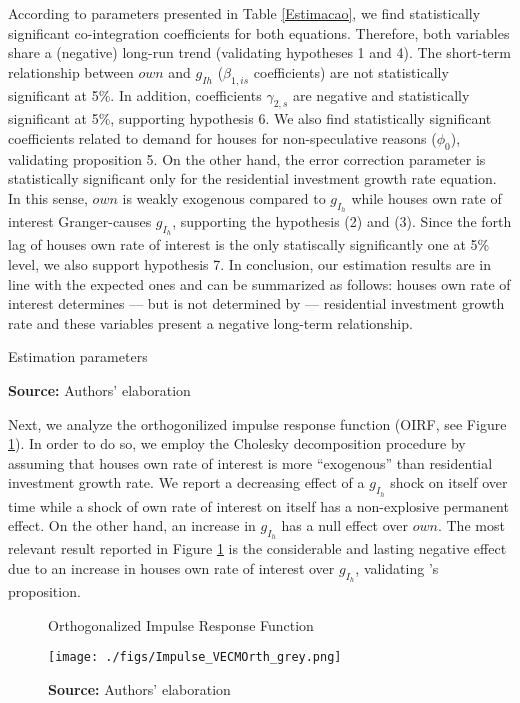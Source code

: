 \documentclass[12pt, a4paper]{article}
\begin{document}
According to parameters presented in Table \ref{Estimacao}, we find statistically significant co-integration  coefficients for both equations. 
Therefore, both variables share a (negative) long-run trend (validating hypotheses 1 and 4).
The short-term relationship between \(own\) and \(g_{Ih}\) (\(\beta_{1, is}\) coefficients) are not statistically significant at 5\%.
In addition, coefficients \(\gamma_{2,s}\) are negative and statistically significant at 5\%, supporting hypothesis 6.
We also find statistically significant coefficients related to demand for houses for non-speculative reasons (\(\phi_0\)), validating proposition 5.
On the other hand, the error correction parameter is statistically significant only for the residential investment growth rate equation.
In this sense, \(own\) is weakly exogenous compared to \(g_{I_h}\) while houses own rate of interest Granger-causes \(g_{I_h}\), supporting the hypothesis (2) and (3).
Since the forth lag of houses own rate of interest is the only statiscally significantly one at 5\% level, we also support hypothesis 7.
In conclusion, our estimation results are in line with the expected ones and can be summarized as follows: houses own rate of interest determines --- but is not determined by --- residential investment growth rate and these variables present a negative long-term relationship.

\begin{table}[h!]
	\caption{Estimation parameters}
	\centering
	
	\caption*{\textbf{Source:} Authors' elaboration}
\end{table}
Next, we analyze the orthogonilized impulse response function (OIRF, see Figure \ref{irf}).
In order to do so, we employ the Cholesky decomposition procedure by assuming that houses own rate of interest is more ``exogenous'' than residential investment growth rate.
We report a decreasing effect of a \(g_{I_h}\) shock on itself over time while a shock of own rate of interest on itself has a non-explosive permanent effect.
On the other hand, an increase in \(g_{I_h}\) has a null effect over \(own\).
The most relevant result reported in Figure \ref{irf} is the considerable and lasting negative effect due to an increase in houses own rate of interest over \(g_{I_h}\), validating \citeauthor*{teixeira_crescimento_2015}'s \citeyear{teixeira_crescimento_2015} proposition.

\begin{figure}[H]
	\centering
	\caption{Orthogonalized Impulse Response Function}
	\label{irf}
	\texttt{[image: ./figs/Impulse\_VECMOrth\_grey.png]}
	\caption*{\textbf{Source:} Authors' elaboration}
\end{figure}
\end{document}
